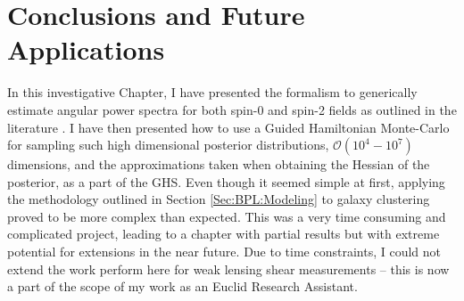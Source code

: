 
\section{Conclusions and Future Applications}
In this investigative Chapter, I have presented the formalism to generically estimate angular power spectra for both spin-0 and spin-2 fields as outlined in the literature \citep{Borrill1999, Hobson2002, Taylor2008,SreeThesis}. I have then presented how to use a Guided Hamiltonian Monte-Carlo for sampling such high dimensional posterior distributions, $\mathcal{O}(10^{4}-10^{7})$ dimensions, and the approximations taken when obtaining the Hessian of the posterior, as a part of the GHS. Even though it seemed simple at first, applying the methodology outlined in Section \ref{Sec:BPL:Modeling} to galaxy clustering proved to be more complex than expected. This was a very time consuming and complicated project, leading to a chapter with partial results but with extreme potential for extensions in the near future. Due to time constraints, I could not extend the work perform here for weak lensing shear measurements -- this is now a part of the scope of my work as an Euclid Research Assistant. 

